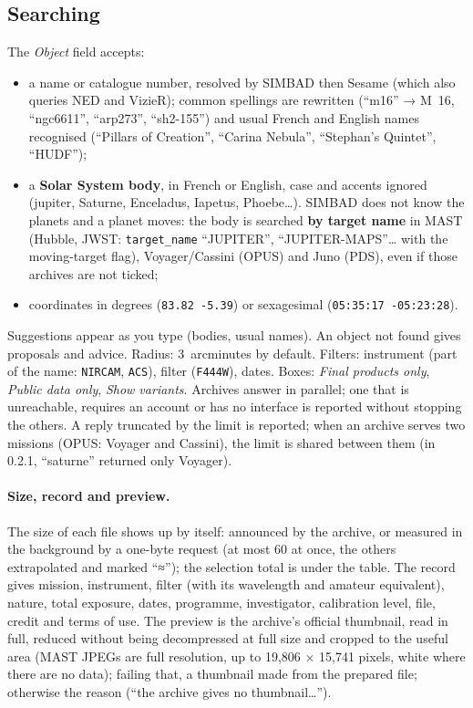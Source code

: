 \subsection{Searching}
The \emph{Object} field accepts:
\begin{itemize}
\item a name or catalogue number, resolved by SIMBAD then Sesame (which also queries NED and VizieR); common spellings
  are rewritten (``m16'' → M~16, ``ngc6611'', ``arp273'', ``sh2-155'') and usual French and English names recognised
  (``Pillars of Creation'', ``Carina Nebula'', ``Stephan's Quintet'', ``HUDF'');
\item a \textbf{Solar System body}, in French or English, case and accents ignored (jupiter, Saturne, Enceladus,
  Iapetus, Phoebe…). SIMBAD does not know the planets and a planet moves: the body is searched \textbf{by target
  name} in MAST (Hubble, JWST: \texttt{target\_name} ``JUPITER'', ``JUPITER-MAPS''… with the moving-target flag),
  Voyager/Cassini (OPUS) and Juno (PDS), even if those archives are not ticked;
\item coordinates in degrees (\texttt{83.82 -5.39}) or sexagesimal (\texttt{05:35:17 -05:23:28}).
\end{itemize}
Suggestions appear as you type (bodies, usual names). An object not found gives proposals and advice. Radius:
3~arcminutes by default. Filters: instrument (part of the name: \texttt{NIRCAM}, \texttt{ACS}), filter
(\texttt{F444W}), dates. Boxes: \emph{Final products only}, \emph{Public data only}, \emph{Show variants}. Archives
answer in parallel; one that is unreachable, requires an account or has no interface is reported without stopping the
others. A reply truncated by the limit is reported; when an archive serves two missions (OPUS: Voyager and Cassini),
the limit is shared between them (in 0.2.1, ``saturne'' returned only Voyager).

\paragraph{Size, record and preview.} The size of each file shows up by itself: announced by the archive, or measured
in the background by a one-byte request (at most 60 at once, the others extrapolated and marked ``≈''); the selection
total is under the table. The record gives mission, instrument, filter (with its wavelength and amateur equivalent),
nature, total exposure, dates, programme, investigator, calibration level, file, credit and terms of use. The preview
is the archive's official thumbnail, read in full, reduced without being decompressed at full size and cropped to the
useful area (MAST JPEGs are full resolution, up to 19,806 × 15,741 pixels, white where there are no data); failing
that, a thumbnail made from the prepared file; otherwise the reason (``the archive gives no thumbnail…'').

